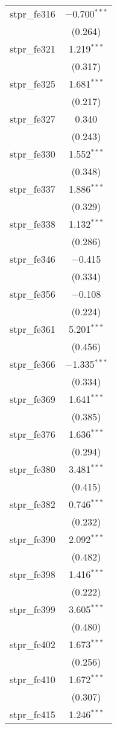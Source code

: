 \begin{table}[!htbp]
\begin{tabular}{@{\extracolsep{5pt}}lc}
  stpr\_fe316 & $-$0.700$^{***}$ \\ 
  & (0.264) \\ 
  stpr\_fe321 & 1.219$^{***}$ \\ 
  & (0.317) \\ 
  stpr\_fe325 & 1.681$^{***}$ \\ 
  & (0.217) \\ 
  stpr\_fe327 & 0.340 \\ 
  & (0.243) \\ 
  stpr\_fe330 & 1.552$^{***}$ \\ 
  & (0.348) \\ 
  stpr\_fe337 & 1.886$^{***}$ \\ 
  & (0.329) \\ 
  stpr\_fe338 & 1.132$^{***}$ \\ 
  & (0.286) \\ 
  stpr\_fe346 & $-$0.415 \\ 
  & (0.334) \\ 
  stpr\_fe356 & $-$0.108 \\ 
  & (0.224) \\ 
  stpr\_fe361 & 5.201$^{***}$ \\ 
  & (0.456) \\ 
  stpr\_fe366 & $-$1.335$^{***}$ \\ 
  & (0.334) \\ 
  stpr\_fe369 & 1.641$^{***}$ \\ 
  & (0.385) \\ 
  stpr\_fe376 & 1.636$^{***}$ \\ 
  & (0.294) \\ 
  stpr\_fe380 & 3.481$^{***}$ \\ 
  & (0.415) \\ 
  stpr\_fe382 & 0.746$^{***}$ \\ 
  & (0.232) \\ 
  stpr\_fe390 & 2.092$^{***}$ \\ 
  & (0.482) \\ 
  stpr\_fe398 & 1.416$^{***}$ \\ 
  & (0.222) \\ 
  stpr\_fe399 & 3.605$^{***}$ \\ 
  & (0.480) \\ 
  stpr\_fe402 & 1.673$^{***}$ \\ 
  & (0.256) \\ 
  stpr\_fe410 & 1.672$^{***}$ \\ 
  & (0.307) \\ 
  stpr\_fe415 & 1.246$^{***}$ \\ 

\end{tabular}
\end{table}
